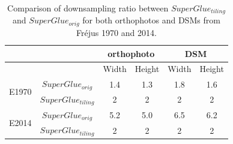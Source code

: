 \begin{table}%
	\centering
	\begin{tabular}{||l|c|c|c|c|c||}\hline
		& & \multicolumn{2}{c|}{orthophoto} & \multicolumn{2}{c||}{\ac{DSM}} \\\hline
		& & Width & Height & Width & Height \\\hline\hline
		\multirow{2}{*}{E1970} & $SuperGlue_{orig}$ & 1.4 & 1.3 & 1.8 & 1.6 \\
		 & $SuperGlue_{tiling}$ & 2 & 2 & 2 & 2 \\\hline
		\multirow{2}{*}{E2014} & $SuperGlue_{orig}$ & 5.2 & 5.0 & 6.5 & 6.2 \\
		 & $SuperGlue_{tiling}$ & 2 & 2 & 2 & 2 \\\hline
	\end{tabular}
	\caption{Comparison of downsampling ratio between $SuperGlue_{tiling}$ and $SuperGlue_{orig}$ for both orthophotos and \ac{DSM}s from Fr{\'e}jus 1970 and 2014.}
	\label{ImgDownRatio}
\end{table}

